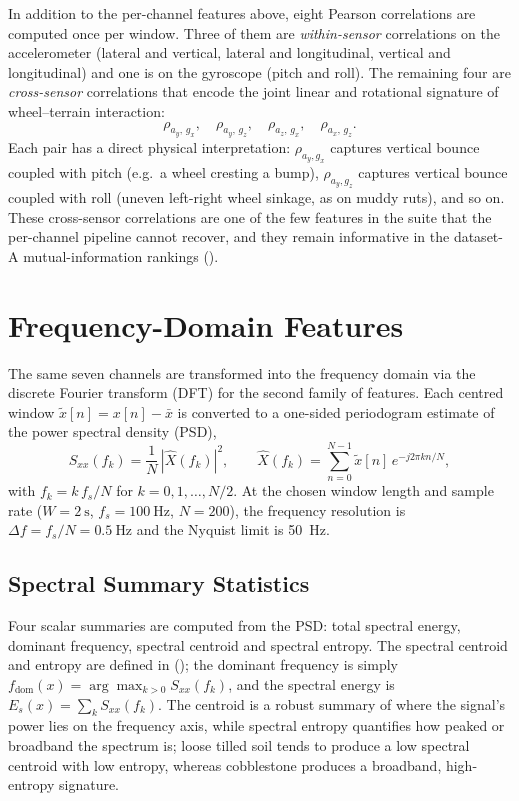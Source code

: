 In addition to the per-channel features above, eight Pearson correlations are computed once per window. Three of them are \emph{within-sensor} correlations on the accelerometer (lateral and vertical, lateral and longitudinal, vertical and longitudinal) and one is on the gyroscope (pitch and roll). The remaining four are \emph{cross-sensor} correlations that encode the joint linear and rotational signature of wheel--terrain interaction:
\begin{equation}
    \rho_{a_y,\,g_x},\quad
    \rho_{a_y,\,g_z},\quad
    \rho_{a_z,\,g_x},\quad
    \rho_{a_x,\,g_z}.
    \label{eq:cross_corrs}
\end{equation}
Each pair has a direct physical interpretation: $\rho_{a_y,g_x}$ captures vertical bounce coupled with pitch (e.g.\ a wheel cresting a bump), $\rho_{a_y,g_z}$ captures vertical bounce coupled with roll (uneven left-right wheel sinkage, as on muddy ruts), and so on. These cross-sensor correlations are one of the few features in the suite that the per-channel pipeline cannot recover, and they remain informative in the dataset-A mutual-information rankings ().

\section{Frequency-Domain Features}
\label{sec:feat_freq}

The same seven channels are transformed into the frequency domain via the discrete Fourier transform (DFT) for the second family of features. Each centred window $\tilde x[n] = x[n] - \bar x$ is converted to a one-sided periodogram estimate of the power spectral density (PSD),
\begin{equation}
    S_{xx}(f_k) = \frac{1}{N}\,|\hat{X}(f_k)|^{2},
    \qquad
    \hat{X}(f_k) = \sum_{n=0}^{N-1} \tilde x[n]\,e^{-j 2\pi k n / N},
    \label{eq:psd}
\end{equation}
with $f_k = k\,f_s / N$ for $k = 0, 1, \dots, N/2$. At the chosen window length and sample rate ($W = \SI{2}{\second}$, $f_s = \SI{100}{\hertz}$, $N=200$), the frequency resolution is $\Delta f = f_s/N = \SI{0.5}{\hertz}$ and the Nyquist limit is \SI{50}{\hertz}.

\subsection{Spectral Summary Statistics}

Four scalar summaries are computed from the PSD: total spectral energy, dominant frequency, spectral centroid and spectral entropy. The spectral centroid and entropy are defined in  (); the dominant frequency is simply $f_{\mathrm{dom}}(x) = \arg\max_{k>0} S_{xx}(f_k)$, and the spectral energy is $E_s(x) = \sum_{k} S_{xx}(f_k)$. The centroid is a robust summary of where the signal's power lies on the frequency axis, while spectral entropy quantifies how peaked or broadband the spectrum is; loose tilled soil tends to produce a low spectral centroid with low entropy, whereas cobblestone produces a broadband, high-entropy signature.

